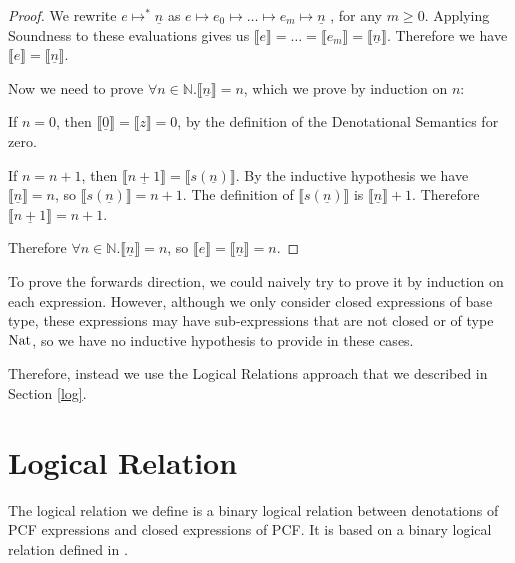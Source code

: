 \begin{proof}
We rewrite $e \mapsto^* \underline{n}$ as $e \mapsto e_0 \mapsto \dots \mapsto e_m \mapsto \underline{n}$ , for any $m \geq 0$. Applying Soundness to these evaluations gives us $\llbracket e\rrbracket = \dots = \llbracket e_m \rrbracket = \llbracket \underline{n} \rrbracket$. Therefore we have $\llbracket  e \rrbracket = \llbracket \underline{n} \rrbracket$.

Now we need to prove $\forall n \in \mathbb{N}. \llbracket \underline{n} \rrbracket = n$, which we prove by induction on $n$:

If $n = 0$, then $\llbracket \underline{0} \rrbracket = \llbracket z \rrbracket = 0$, by the definition of the Denotational Semantics for zero.


If $n = n + 1$, then $\llbracket \underline{n + 1} \rrbracket = \llbracket s(\underline{n}) \rrbracket$. By the inductive hypothesis we have $\llbracket \underline{n} \rrbracket = n$, so $\llbracket s(\underline{n}) \rrbracket = n + 1$. The definition of $\llbracket s(\underline{n}) \rrbracket$ is $\llbracket  \underline{n} \rrbracket + 1$. Therefore $\llbracket \underline{n + 1} \rrbracket = n + 1$.


Therefore $\forall n \in \mathbb{N}. \llbracket \underline{n} \rrbracket  = n$, so $\llbracket e \rrbracket =  \llbracket \underline{n} \rrbracket  = n$.

\end{proof}

To prove the forwards direction, we could naively try to prove it by induction on each expression. However,  although we only consider closed expressions of base type, these expressions may have sub-expressions that are not closed or of type $\operatorname{Nat}$, so we have no inductive hypothesis to provide in these cases.

Therefore, instead we use the Logical Relations approach that we described in Section \ref{log}.

\section{Logical Relation}\label{const}
The logical relation we define is a binary logical relation between denotations of PCF expressions and closed expressions of PCF. It is based on a binary logical relation defined in \citep{Streicher06}. 

